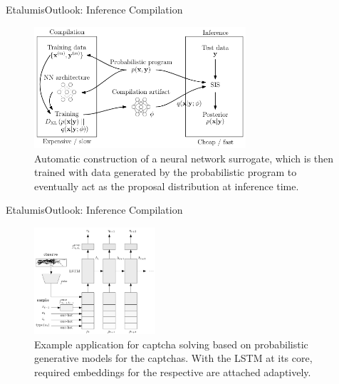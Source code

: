 \documentclass[AERbeamer%
              ,optEnglish%
              ,optBiber%
              ,optBibstyleAlphabetic%
              ,optBeamerClassicFormat%
              ]{AERlatex}%
\begin{document}
\begin{frame}[c]{Etalumis}{Outlook: Inference Compilation}
    \centering
    \begin{figure}
        \centering
        \includegraphics[width=0.7\textwidth]{InferenceCompilationSketch.png}
        \caption{Automatic construction of a neural network surrogate, which is then trained with data generated by the probabilistic
                 program to eventually act as the proposal distribution at inference time.}
    \end{figure}
\end{frame}


\begin{frame}[c]{Etalumis}{Outlook: Inference Compilation}
    \centering
    \begin{figure}
        \centering
        \includegraphics[width=0.4\textwidth]{InferenceCompilationPractice.png}
        \caption{Example application for captcha solving based on probabilistic generative models for the captchas.
                 With the LSTM at its core, required embeddings for the respective are attached adaptively.}
    \end{figure}
\end{frame}
\end{document}
